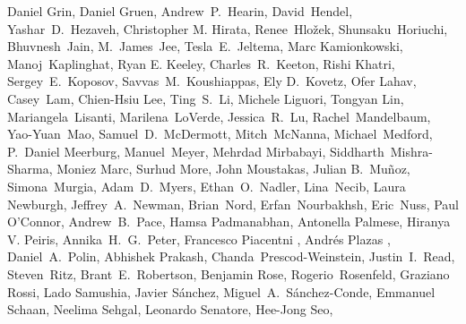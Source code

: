 \begin{raggedright}
Daniel Grin,
Daniel Gruen,
Andrew~P.~Hearin,
David~Hendel,
Yashar~D.~Hezaveh,
Christopher M. Hirata,
Renee~Hlo\v{z}ek,
Shunsaku~Horiuchi,
Bhuvnesh~Jain,
M.~James~Jee,
Tesla~E.~Jeltema,
Marc Kamionkowski,
Manoj~Kaplinghat,
Ryan E. Keeley,
Charles~R.~Keeton,
Rishi Khatri,
Sergey~E.~Koposov,
Savvas~M.~Koushiappas,
Ely D.~Kovetz,
Ofer Lahav,
Casey~Lam,
Chien-Hsiu Lee,
Ting~S.~Li,
Michele Liguori,
Tongyan Lin,
Mariangela~Lisanti,
Marilena~LoVerde,
Jessica~R.~Lu,
Rachel~Mandelbaum,
Yao-Yuan~Mao,
Samuel~D.~McDermott,
Mitch~McNanna,
Michael~Medford,
P.~Daniel Meerburg,
Manuel~Meyer,
Mehrdad Mirbabayi,
Siddharth~Mishra-Sharma,
Moniez Marc,
Surhud More,
John Moustakas,
Julian B.~Mu\~noz,
Simona~Murgia,
Adam~D.~Myers,
Ethan~O.~Nadler,
Lina~Necib,
Laura Newburgh,
Jeffrey~A.~Newman,
Brian~Nord,
Erfan~Nourbakhsh,
Eric~Nuss,
Paul O'Connor,
Andrew~B.~Pace,
Hamsa Padmanabhan,
Antonella Palmese,
Hiranya V. Peiris,
Annika~H.~G.~Peter,
Francesco Piacentni ,
Andr\'es Plazas ,
Daniel~A.~Polin,
Abhishek Prakash,
Chanda~Prescod-Weinstein,
Justin~I.~Read,
Steven~Ritz,
Brant~E.~Robertson,
Benjamin Rose,
Rogerio~Rosenfeld,
Graziano Rossi,
Lado Samushia,
Javier S\'{a}nchez,
Miguel~A.~S\'anchez-Conde,
Emmanuel Schaan,
Neelima Sehgal,
Leonardo Senatore,
Hee-Jong Seo,

\end{raggedright}
